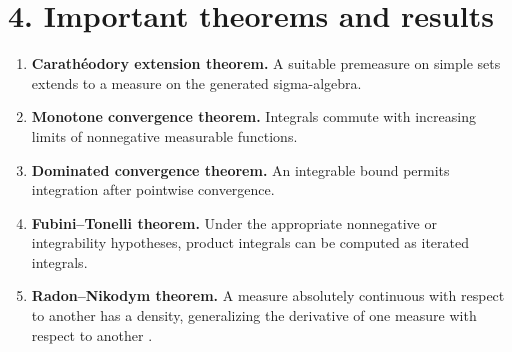 \section*{4. Important theorems and results}
\begin{enumerate}[leftmargin=*,itemsep=0.35em]
\item \textbf{Carath\'eodory extension theorem.} A suitable premeasure on simple sets extends to a measure on the generated sigma-algebra.

\item \textbf{Monotone convergence theorem.} Integrals commute with increasing limits of nonnegative measurable functions.

\item \textbf{Dominated convergence theorem.} An integrable bound permits integration after pointwise convergence.

\item \textbf{Fubini--Tonelli theorem.} Under the appropriate nonnegative or integrability hypotheses, product integrals can be computed as iterated integrals.

\item \textbf{Radon--Nikodym theorem.} A measure absolutely continuous with respect to another has a density, generalizing the derivative of one measure with respect to another \cite{measure_theory_ref3}.
\end{enumerate}

\theoryapplications
{}

